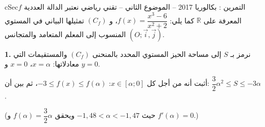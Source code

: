 \documentclass[12pt,a4paper]{article}
\newenvironment{BOX}[2]{\begin{otherlanguage}{english}\begin{arbox}{#1}{#2}}{\end{arbox}\end{otherlanguage}}
\newcounter{exo}
\newenvironment{tamrin}[1]{\stepcounter{exo}\begin{BOX}{cSec}{التمرين \theexo: #1}}{\end{BOX}}
\newcommand{\R}{\mathbb{R}}
\newcommand{\QQ}[1]{\par\smallskip\textbf{#1.} }
\begin{document}
\begin{tamrin}{بكالوريا 2017 -- الموضوع الثاني -- تقني رياضي}
نعتبر الدالة العددية $f$ المعرفة على $\R$ كما يلي: $f(x)=\dfrac{x^{3}-6}{x^{2}+2}$، و $(C_f)$ تمثيلها البياني في المستوي المنسوب إلى المعلم المتعامد والمتجانس $(O;\vec{i},\vec{j})$.

\QQ{1} نرمز بـ $S$ إلى مساحة الحيز المستوي المحدد بالمنحنى $(C_f)$ والمستقيمات التي معادلاتها: $x=\alpha$، $x=0$ و $y=0$.

أثبت أنه من أجل كل $x\in[\alpha;0]$: $-3\le f(x)\le f(\alpha)$، ثم بين أن: $\dfrac32\alpha^{2}\le S\le-3\alpha$.

(حيث $-1{,}48<\alpha<-1{,}47$ ويحقق $f(\alpha)=\dfrac32\alpha$ و $f'(\alpha)=0$.)
\end{tamrin}
\end{document}
